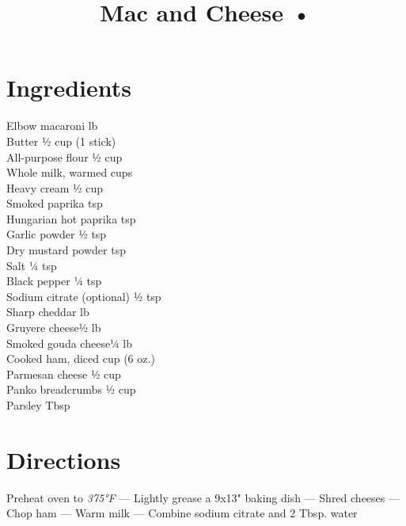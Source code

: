 \documentclass[11pt,letterpaper]{article}
\title{Mac and Cheese •}
\author{}
\date{}
\begin{document}
\maketitle
\thispagestyle{empty}

\vspace{-60pt}

\section*{Ingredients}
\setlength{\columnsep}{20pt}
\begin{multicols}{2}
\noindent
Elbow macaroni  lb \\
Butter \dotfill ½ cup (1 stick) \\
All-purpose flour \dotfill ½ cup \\
Whole milk, warmed  cups \\
Heavy cream \dotfill ½ cup \\
Smoked paprika  tsp \\
Hungarian hot paprika  tsp \\
Garlic powder \dotfill ½ tsp \\
\columnbreak
Dry mustard powder  tsp \\
Salt \dotfill ¼ tsp \\
Black pepper \dotfill ¼ tsp \\
Sodium citrate (optional) \dotfill ½ tsp \\
Sharp cheddar  lb \\
Gruyere cheese\dotfill ½ lb \\
Smoked gouda cheese\dotfill ¼ lb \\
Cooked ham, diced  cup (6 oz.) \\
Parmesan cheese \dotfill ½ cup \\
Panko breadcrumbs \dotfill ½ cup \\
Parsley  Tbsp
\end{multicols}

\section*{Directions}
Preheat oven to \textit{375°F} ---
Lightly grease a 9x13" baking dish ---
Shred cheeses ---
Chop ham  ---
Warm milk ---
Combine sodium citrate and 2 Tbsp. water
\end{document}
